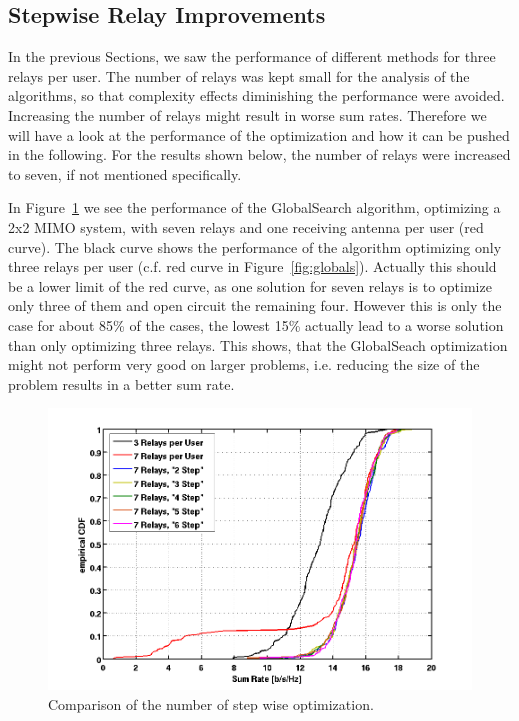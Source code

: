 \subsection{Stepwise Relay Improvements}
\label{sec:stepwise}
In the previous Sections, we saw the performance of different methods for three relays per user.
The number of relays was kept small for the analysis of the algorithms, so that complexity effects diminishing the performance were avoided.
Increasing the number of relays might result in worse sum rates.
Therefore we will have a look at the performance of the optimization and how it can be pushed in the following.
For the results shown below, the number of relays were increased to seven, if not mentioned specifically.

In Figure~\ref{fig:nrel7} we see the performance of the GlobalSearch algorithm, optimizing a 2x2 MIMO system, with seven relays and one receiving antenna per user (red curve).
The black curve shows the performance of the algorithm optimizing only three relays per user (c.f.  red curve in Figure~\ref{fig:globals}).
Actually this should be a lower limit of the red curve, as one solution for seven relays is to optimize only three of them and open circuit the remaining four.
However this is only the case for about 85\% of the cases, the lowest 15\% actually lead to a worse solution than only optimizing three relays.
This shows, that the GlobalSeach optimization might not perform very good on larger problems, i.e. reducing the size of the problem results in a better sum rate.

\begin{figure}[h]
\centering
  \includegraphics[width=0.7\linewidth]{images/Relstepcomparison_edited.png}
\caption{Comparison of the number of step wise optimization.}
\label{fig:nrel7}
\end{figure}

